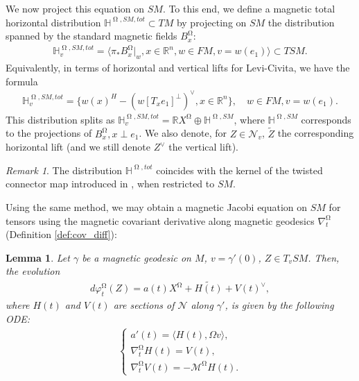 \documentclass[12pt]{amsart}
\numberwithin{numbering}{section}
\theoremstyle{plain}
\newtheorem{lem}[numbering]{Lemma}
\theoremstyle{definition}
\theoremstyle{remark}
\newtheorem{rmq}[numbering]{Remark}
\numberwithin{equation}{section}
\DeclareMathOperator{\mg}{\Omega}
\newcommand{\R}{\mathbb{R}}
\newcommand{\HH}{\mathbb{H}}
\begin{document}
\medskip

We now project this equation on $SM$. To this end, we define a magnetic total horizontal distribution $\mathbb{H}^{\mg, SM, tot} \subset TM$ by projecting on $SM$ the distribution spanned by the standard magnetic fields $B^{\mg}_x$:
\begin{align*}
\mathbb{H}^{\mg, SM, tot}_v = \langle \pi_* B_x^{\mg} \vert_w, x \in \R^n, w \in FM, v = w(e_1) \rangle \subset TSM.
\end{align*}
Equivalently, in terms of horizontal and vertical lifts for Levi-Civita, we have the formula
\begin{align*}
\HH^{\mg, SM, tot}_v = \{w(x)^H - (w[T_x e_1]^\perp)^\vee, x \in \R^n\}, \quad w \in FM, v = w(e_1).
\end{align*}
This distribution splits as $\HH^{\mg, SM, tot}_v = \R X^{\mg} \oplus \HH^{\mg, SM}$, where $\HH^{\mg, SM}$ corresponds to the projections of $B_{x}^{\mg}, x \perp e_1$. We also denote, for $Z \in \mathcal{N}_v$, $\tilde{Z}$ the corresponding horizontal lift (and we still denote $Z^\vee$ the vertical lift).

\begin{rmq}
The distribution $\HH^{\mg, tot}$ coincides with the kernel of the twisted connector map introduced in \cite{assenza2025hopf}, when restricted to $SM$.
\end{rmq}



Using the same method, we may obtain a magnetic Jacobi equation on $SM$ for tensors using the magnetic covariant derivative along magnetic geodesics $\nabla^{\mg}_t$ (Definition \ref{def:cov_diff}):
\begin{lem}
Let $\gamma$ be a magnetic geodesic on $M$, $v = \gamma'(0)$, $Z \in T_v SM$. Then, the evolution 
\begin{align*}
d\varphi_t^{\mg}(Z) = a(t) X^{\mg} + \widetilde{H(t)} + V(t)^\vee,
\end{align*}
where $H(t)$ and $V(t)$ are sections of $\mathcal{N}$ along $\gamma'$, is given by the following ODE:
\begin{align} \label{eq:mag_jacobi_sm}
\begin{cases}
a'(t) = \langle H(t), \Omega v \rangle, \\
\nabla_t^{\mg} H(t) = V(t), \\
\nabla_t^{\mg} V(t) = - \mathcal{M}^{\mg} H(t).
\end{cases}
\end{align} 
\end{lem}
\end{document}
